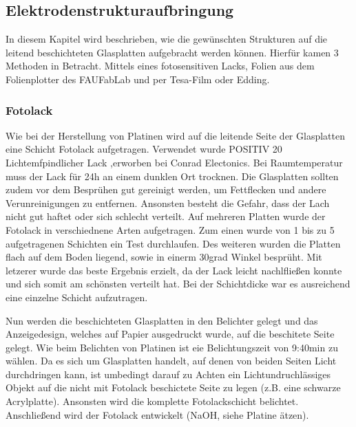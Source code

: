 
\subsection{Elektrodenstrukturaufbringung}

In diesem Kapitel wird beschrieben, wie die gewünschten Strukturen auf die leitend beschichteten Glasplatten aufgebracht werden können. Hierfür kamen 3 Methoden in Betracht. Mittels eines fotosensitiven Lacks, Folien aus dem Folienplotter des FAUFabLab und per Tesa-Film oder Edding.

\subsubsection*{Fotolack}

Wie bei der Herstellung von Platinen wird auf die leitende Seite der Glasplatten eine Schicht Fotolack aufgetragen. Verwendet wurde POSITIV 20 Lichtemfpindlicher Lack ,erworben bei Conrad Electonics.
Bei Raumtemperatur muss der Lack für 24h an einem dunklen Ort trocknen. Die Glasplatten sollten zudem vor dem Besprühen gut gereinigt werden, um Fettflecken und andere Verunreinigungen zu entfernen. Ansonsten besteht die Gefahr, dass der Lach nicht gut haftet oder sich schlecht verteilt.
Auf mehreren Platten wurde der Fotolack in verschiednene Arten aufgetragen. Zum einen wurde von 1 bis zu 5 aufgetragenen Schichten ein Test durchlaufen. Des weiteren wurden die Platten flach auf dem Boden liegend, sowie in einerm 30grad Winkel besprüht.
Mit letzerer wurde das beste Ergebnis erzielt, da der Lack leicht nachlfließen konnte und sich somit am schönsten verteilt hat. Bei der Schichtdicke war es ausreichend eine einzelne Schicht aufzutragen.

Nun werden die beschichteten Glasplatten in den Belichter gelegt und das Anzeigedesign, welches auf Papier ausgedruckt wurde, auf die beschitete Seite gelegt. Wie beim Belichten von Platinen ist eie Belichtungszeit von 9:40min zu wählen. Da es sich um Glasplatten handelt, auf denen von beiden Seiten Licht durchdringen kann, ist umbedingt darauf zu Achten ein Lichtundruchlässiges Objekt auf die nicht mit Fotolack beschictete Seite zu legen (z.B. eine schwarze Acrylplatte). Ansonsten wird die komplette Fotolackschicht belichtet. Anschließend wird der Fotolack entwickelt (NaOH, siehe Platine ätzen).


